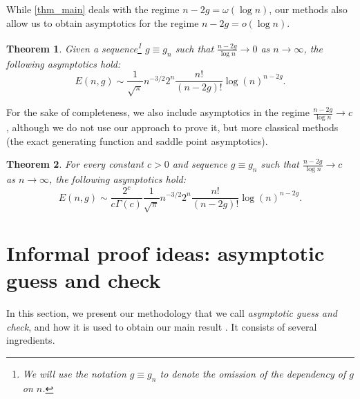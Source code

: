 \documentclass[a4paper,12pt]{article}
\newtheorem{theorem}{Theorem}
\theoremstyle{definition}
\newcommand{\E}{E}
\newcommand{\largev}{\ensuremath{n-2g =\omega(\log n)}}
\newcommand{\smallv}{\ensuremath{n-2g =o(\log n)}}
\begin{document}
While \cref{thm_main} deals with the regime $\largev$, our methods also allow us to obtain asymptotics for the regime \smallv.

\begin{theorem}\label{thm_smallv}
  Given a sequence\footnote{We will use the notation $g \equiv g_n$ to denote the omission of the dependency of $g$ on $n$. 
  } $g \equiv g_n$ such that $\frac{n-2g}{\log n}\rightarrow 0$ as $n\to\infty$, the following asymptotics hold:
  \begin{equation}\label{eq_asympto_smallv}
    \E(n,g)\sim\frac{1}{\sqrt{\pi}} n^{-3/2} 2^n \frac{n!}{(n-2g)!}\log(n)^{n-2g}.
  \end{equation}
\end{theorem}

For the sake of completeness, we also include asymptotics in the regime $\frac{n-2g}{\log n}\to c$, although we do not use our approach to prove it, but more classical methods (the exact generating function and saddle point asymptotics).

\begin{theorem}\label{thm_logv}
  For every constant $c>0$ and sequence $g \equiv g_n$ such that $\frac{n-2g}{\log n}\rightarrow c$ as $n\to\infty$, the following asymptotics hold:
  \begin{equation}\label{eq_asympto_midv}
    \E(n,g)\sim \frac{2^{c}}{c\Gamma(c)}\frac{1}{\sqrt{\pi}} n^{-3/2} 2^n \frac{n!}{(n-2g)!}\log(n)^{n-2g}.
  \end{equation}
\end{theorem}


\section{Informal proof ideas: asymptotic guess and check}\label{sec:guess}

In this section, we present our methodology that we call \emph{asymptotic guess and check}, and how it is used to obtain our main result . It consists of several ingredients.
\end{document}
